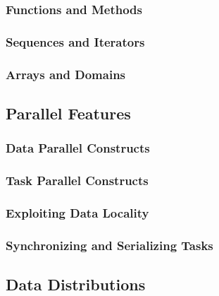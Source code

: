 \subsubsection{Functions and Methods}
\label{Functions_and_Methods}

\subsubsection{Sequences and Iterators}
\label{Sequences_and_Iterators}


\subsubsection{Arrays and Domains}
\label{Arrays_and_Domains}


\subsection{Parallel Features}
\label{Parallel_Features}


\subsubsection{Data Parallel Constructs}
\label{Data_Parallel_Constructs}


\subsubsection{Task Parallel Constructs}
\label{Task_Parallel_Constructs}


\subsubsection{Exploiting Data Locality}
\label{Exploiting_Data_Locality}


\subsubsection{Synchronizing and Serializing Tasks}
\label{Synchronizing_and_Serializing_Tasks}


\subsection{Data Distributions}
\label{Data_Distributions}

